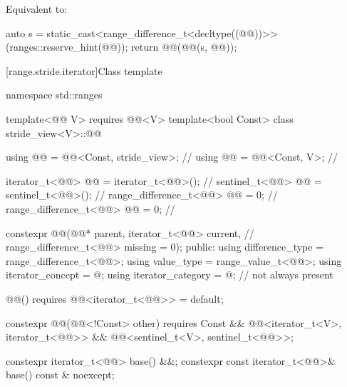 \begin{itemdescr}
\pnum
\effects
Equivalent to:
\begin{codeblock}
auto s = static_cast<range_difference_t<decltype((@@))>>(ranges::reserve_hint(@@));
return @@(@@(s, @@));
\end{codeblock}
\end{itemdescr}

[range.stride.iterator]{Class template }

%
\begin{codeblock}
namespace std::ranges {
  template<@@ V>
    requires @@<V>
  template<bool Const>
  class stride_view<V>::@@ {
    using @@ = @@<Const, stride_view>;                      // \expos
    using @@ = @@<Const, V>;                                  // \expos

    iterator_t<@@> @@ = iterator_t<@@>();                      // \expos
    sentinel_t<@@> @@ = sentinel_t<@@>();                          // \expos
    range_difference_t<@@> @@ = 0;                                // \expos
    range_difference_t<@@> @@ = 0;                               // \expos

    constexpr @@(@@* parent, iterator_t<@@> current,        // \expos
                       range_difference_t<@@> missing = 0);
  public:
    using difference_type = range_difference_t<@@>;
    using value_type = range_value_t<@@>;
    using iterator_concept = @\seebelow@;
    using iterator_category = @\seebelow@;    // not always present

    @@() requires @@<iterator_t<@@>> = default;

    constexpr @@(@@<!Const> other)
      requires Const && @@<iterator_t<V>, iterator_t<@@>>
                     && @@<sentinel_t<V>, sentinel_t<@@>>;

    constexpr iterator_t<@@> base() &&;
    constexpr const iterator_t<@@>& base() const & noexcept;

}}
\end{codeblock}
